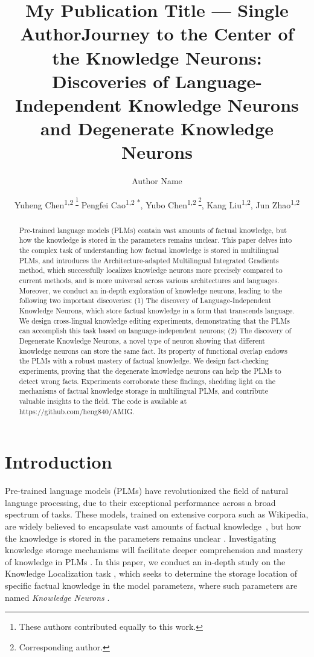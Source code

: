 \documentclass[]{article}
\title{My Publication Title --- Single Author}
\author {
Author Name
}
\title{Journey to the Center of the Knowledge Neurons: Discoveries of Language-Independent Knowledge Neurons and Degenerate Knowledge Neurons}
\author{
Yuheng Chen\textsuperscript{\rm 1,\rm 2 \thanks{These authors contributed equally to this work.}}
Pengfei Cao\textsuperscript{\rm 1,\rm 2 *},
Yubo Chen\textsuperscript{\rm 1,\rm 2 \thanks{Corresponding author.}},
Kang Liu\textsuperscript{\rm 1,\rm 2},
Jun Zhao\textsuperscript{\rm 1,\rm 2}
}
\begin{document}
\maketitle



\begin{abstract}
Pre-trained language models (PLMs) contain vast amounts of factual knowledge, but how the knowledge is stored in the parameters remains unclear. This paper delves into the complex task of understanding how factual knowledge is stored in multilingual PLMs, and introduces the Architecture-adapted Multilingual Integrated Gradients method, which successfully localizes knowledge neurons more precisely compared to current methods, and is more universal across various architectures and languages. Moreover, we conduct an in-depth exploration of knowledge neurons, leading to the following two important discoveries: (1) The discovery of Language-Independent Knowledge Neurons, which store factual knowledge in a form that transcends language. We design cross-lingual knowledge editing experiments, demonstrating that the PLMs can accomplish this task based on language-independent neurons; (2) The discovery of Degenerate Knowledge Neurons, a novel type of neuron showing that different knowledge neurons can store the same fact. Its property of functional overlap endows the PLMs with a robust mastery of factual knowledge. We design fact-checking experiments, proving that the degenerate knowledge neurons can help the PLMs to detect wrong facts. Experiments corroborate these findings, shedding light on the mechanisms of factual knowledge storage in multilingual PLMs, and contribute valuable insights to the field. The code is available at https://github.com/heng840/AMIG.
\end{abstract}


\section{Introduction}
Pre-trained language models (PLMs) \cite{mbert,gpt2,mgpt,openai2023gpt4,touvron2023llama} have revolutionized the field of natural language processing, due to their exceptional performance across a broad spectrum of tasks.
These models, trained on extensive corpora such as Wikipedia, are widely believed to encapsulate vast amounts of factual knowledge~\cite{knowledge-base,knowledge_know_fact}, but how the knowledge is stored in the parameters remains unclear \cite{kandpal2023large}.
Investigating knowledge storage mechanisms will facilitate deeper comprehension and mastery of knowledge in PLMs \cite{zhen2022survey,zhao2023survey}. In this paper, we conduct an in-depth study on the Knowledge Localization task \cite{localization,kl}, which seeks to determine the storage location of specific factual knowledge in the model parameters, where such parameters are named \textit{Knowledge Neurons} \cite{dai2022kn}.
\end{document}
